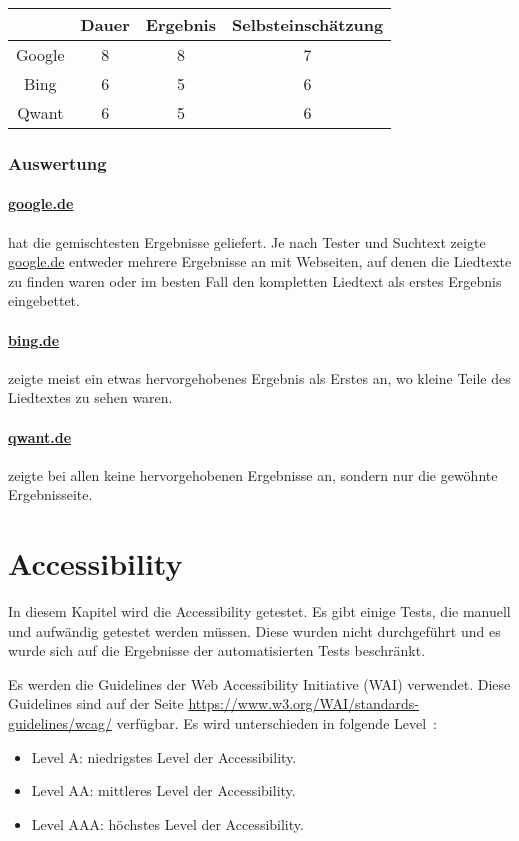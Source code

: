 \begin{tabular}{|c|c|c|c|}
    \hline
    & Dauer & Ergebnis & Selbsteinschätzung \\
    \hline
    Google & 8     & 8       & 7                  \\
    \hline
    Bing   & 6     & 5        & 6                  \\
    \hline
    Qwant  & 6     & 5        & 6                  \\
    \hline
\end{tabular}

\subsubsection*{Auswertung}
\paragraph{\url{google.de}} hat die gemischtesten Ergebnisse geliefert.
Je nach Tester und Suchtext zeigte \url{google.de} entweder mehrere Ergebnisse an mit Webseiten,
auf denen die Liedtexte zu finden waren oder im besten Fall den kompletten Liedtext als erstes Ergebnis eingebettet.
\paragraph{\url{bing.de}} zeigte meist ein etwas hervorgehobenes Ergebnis als Erstes an, wo kleine Teile des Liedtextes zu sehen waren.
\paragraph{\url{qwant.de}} zeigte bei allen keine hervorgehobenen Ergebnisse an, sondern nur die gewöhnte Ergebnisseite.

\section{Accessibility}\label{sec:accessibility}
In diesem Kapitel wird die Accessibility getestet.
Es gibt einige Tests, die manuell und aufwändig getestet werden müssen.
Diese wurden nicht durchgeführt und es wurde sich auf die Ergebnisse der automatisierten Tests beschränkt.

Es werden die Guidelines der Web Accessibility Initiative (WAI) verwendet.
Diese Guidelines sind auf der Seite \url{https://www.w3.org/WAI/standards-guidelines/wcag/} verfügbar.\newline
Es wird unterschieden in folgende Level~\cite{WCAG21}:
\begin{itemize}
    \item Level A: niedrigstes Level der Accessibility.
    \item Level AA: mittleres Level der Accessibility.
    \item Level AAA: höchstes Level der Accessibility.
\end{itemize}

